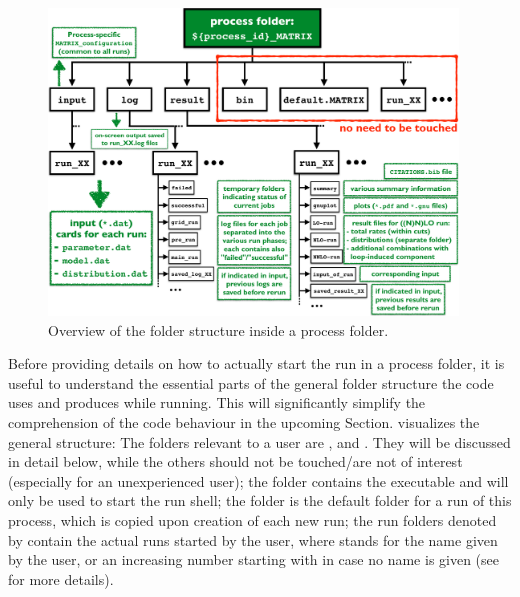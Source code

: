 \documentclass[english,11pt]{article}
\begin{document}
\begin{figure}[t]
\begin{center}
\hspace{0.15cm}
\includegraphics[trim = 7mm -7mm 0mm 0mm, width=0.97\textwidth]{plots/MATRIX_folder_structure.pdf}
\caption[]{\label{fig:folderstructure}{Overview of the folder structure inside a \Matrix{} process folder.
}}
\end{center}
\end{figure}

Before providing details on how to actually start the run in a \Matrix{} process folder, it is useful 
to understand the essential parts of the general folder structure the code uses and produces 
while running. This will significantly simplify the comprehension of the code behaviour in the 
upcoming Section.  visualizes the general structure: 
The folders relevant to a user are ,  and . They will be discussed in detail 
below, while the others should not be touched/are not of interest (especially for an unexperienced user); 
the folder  contains the executable and will only be used to start the \Matrix{} run shell; the folder 
 is the default folder for a run of this process, which is copied upon creation 
of each new run; the run folders denoted by  contain the actual runs started by the user, where  stands for 
the name given by the user, or an increasing number starting with   in case no name is given 
(see  for more details).
\end{document}
